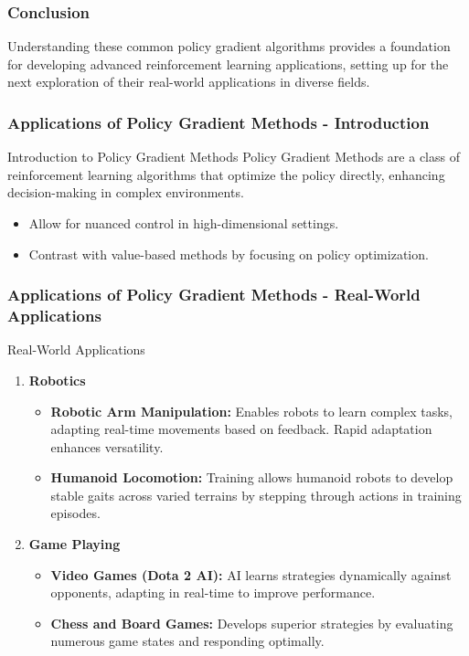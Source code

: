 \documentclass{beamer}
\begin{document}
\begin{frame}[fragile]
    \frametitle{Conclusion}

    Understanding these common policy gradient algorithms provides a foundation for developing advanced reinforcement learning applications, setting up for the next exploration of their real-world applications in diverse fields.
\end{frame}

\begin{frame}[fragile]
    \frametitle{Applications of Policy Gradient Methods - Introduction}
    \begin{block}{Introduction to Policy Gradient Methods}
        Policy Gradient Methods are a class of reinforcement learning algorithms that optimize the policy directly, enhancing decision-making in complex environments. 
        \begin{itemize}
            \item Allow for nuanced control in high-dimensional settings.
            \item Contrast with value-based methods by focusing on policy optimization.
        \end{itemize}
    \end{block}
\end{frame}

\begin{frame}[fragile]
    \frametitle{Applications of Policy Gradient Methods - Real-World Applications}
    \begin{block}{Real-World Applications}
        \begin{enumerate}
            \item \textbf{Robotics}
                \begin{itemize}
                    \item \textbf{Robotic Arm Manipulation:} 
                        Enables robots to learn complex tasks, adapting real-time movements based on feedback. Rapid adaptation enhances versatility.
                    \item \textbf{Humanoid Locomotion:} 
                        Training allows humanoid robots to develop stable gaits across varied terrains by stepping through actions in training episodes.
                \end{itemize}
            \item \textbf{Game Playing}
                \begin{itemize}
                    \item \textbf{Video Games (Dota 2 AI):} 
                        AI learns strategies dynamically against opponents, adapting in real-time to improve performance.
                    \item \textbf{Chess and Board Games:} 
                        Develops superior strategies by evaluating numerous game states and responding optimally.
                \end{itemize}
        \end{enumerate}
    \end{block}
\end{frame}
\end{document}
